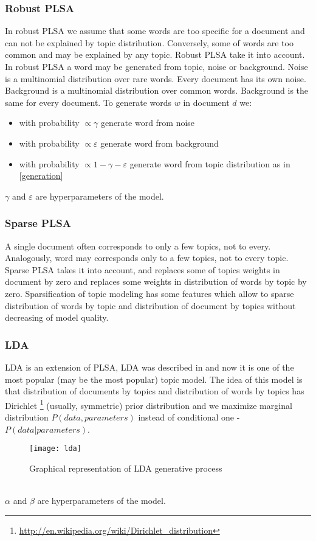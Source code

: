 \subsubsection*{Robust PLSA}
    In robust PLSA we assume that some words are too specific for a document and can not be explained by topic
    distribution. Conversely, some of words are too common and may be explained by any topic.
    Robust PLSA take it into account. In robust PLSA a word may be generated from topic, noise or background.
    Noise is a multinomial distribution over rare words. Every document has its own noise.
    Background is a multinomial distribution over common words. Background is the same for every document.
    To generate words $w$  in document $d$ we:
    \begin{itemize}
	\item with probability $\propto \gamma$ generate word from noise
	\item with probability $\propto \varepsilon$ generate word from background
	\item with probability $\propto 1 - \gamma - \varepsilon$ generate word from topic
	    distribution as in \ref{generation}
    \end{itemize}
    $\gamma$ and $\varepsilon$ are hyperparameters of the model.

\subsubsection*{Sparse PLSA} \label{sparseModel} 
    A single document often corresponds to only a few topics, not to every. Analogously,
    word may corresponds only to a few topics, not to every topic. Sparse PLSA takes it into account,
    and replaces some of topics weights in document by zero and replaces some weights in distribution
    of words by topic by zero. Sparsification of topic modeling has some features which allow to sparse distribution of
    words by topic and distribution of document by topics without decreasing of model quality.

\subsubsection*{LDA} \label{LDA}
    LDA is an extension of PLSA, LDA was described in \cite{LDA} and now it is one of the most popular (may be the most popular) topic model. The idea of this model is that
    distribution of documents by topics and distribution of words by topics has Dirichlet \footnote{\url{http://en.wikipedia.org/wiki/Dirichlet_distribution}} (usually, symmetric) prior distribution and we maximize marginal distribution $P(data, parameters)$ instead of conditional one \-- $P(data | parameters)$. 
    \begin{figure}[!ht]
    \caption{Graphical representation of LDA generative process}
    \begin{minipage}{\textwidth}
	\texttt{[image: lda]}
    \end{minipage}
    \end{figure}\\
    $\alpha$ and $\beta$ are hyperparameters of the model. 
 
